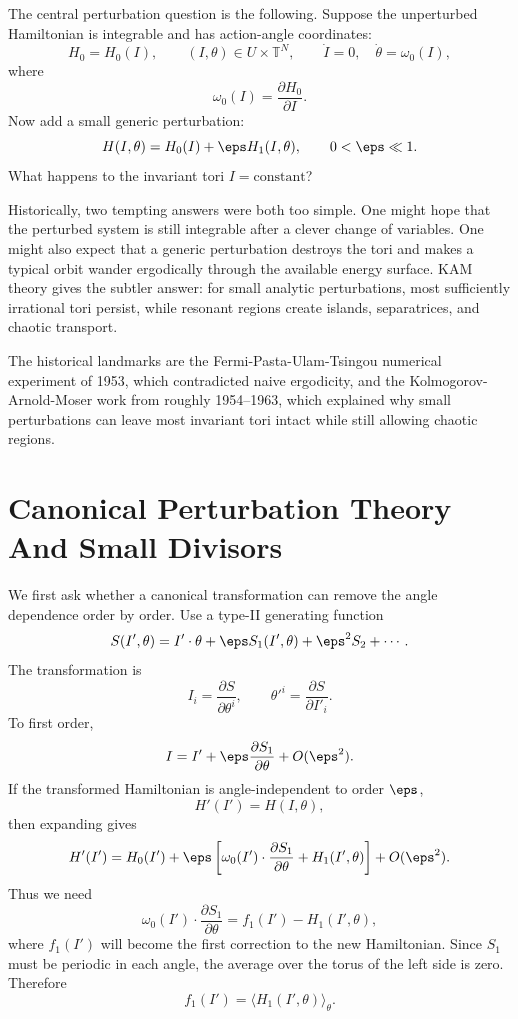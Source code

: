 The central perturbation question is the following. Suppose the unperturbed
Hamiltonian is integrable and has action-angle coordinates:
\[
  H_0=H_0(I),
  \qquad
  (I,\theta)\in U\times\mathbb T^N,
  \qquad
  \dot I=0,\quad \dot\theta=\omega_0(I),
\]
where
\[
  \omega_0(I)=\frac{\partial H_0}{\partial I}.
\]
Now add a small generic perturbation:
\[
  H(I,\theta)=H_0(I)+\eps H_1(I,\theta),
  \qquad
  0<\eps\ll 1.
\]
What happens to the invariant tori \(I=\text{constant}\)?

Historically, two tempting answers were both too simple. One might hope that
the perturbed system is still integrable after a clever change of variables.
One might also expect that a generic perturbation destroys the tori and makes a
typical orbit wander ergodically through the available energy surface. KAM
theory gives the subtler answer: for small analytic perturbations, most
sufficiently irrational tori persist, while resonant regions create islands,
separatrices, and chaotic transport.

The historical landmarks are the Fermi-Pasta-Ulam-Tsingou numerical experiment
of 1953, which contradicted naive ergodicity, and the
Kolmogorov-Arnold-Moser work from roughly 1954--1963, which explained why
small perturbations can leave most invariant tori intact while still allowing
chaotic regions.

\section{Canonical Perturbation Theory And Small Divisors}
\label{sec:canonical-perturbation-small-divisors}

We first ask whether a canonical transformation can remove the angle dependence
order by order. Use a type-II generating function
\[
  S(I',\theta)=I'\cdot\theta+\eps S_1(I',\theta)+\eps^2S_2+\cdots.
\]
The transformation is
\[
  I_i=\frac{\partial S}{\partial \theta^i},
  \qquad
  \theta'^i=\frac{\partial S}{\partial I'_i}.
\]
To first order,
\[
  I=I'+\eps\frac{\partial S_1}{\partial \theta}+O(\eps^2).
\]
If the transformed Hamiltonian is angle-independent to order \(\eps\),
\[
  H'(I')=H(I,\theta),
\]
then expanding gives
\[
  H'(I')
  =
  H_0(I')
  +
  \eps\left[
    \omega_0(I')\cdot\frac{\partial S_1}{\partial \theta}
    +
    H_1(I',\theta)
  \right]
  +
  O(\eps^2).
\]
Thus we need
\[
  \omega_0(I')\cdot\frac{\partial S_1}{\partial \theta}
  =
  f_1(I')-H_1(I',\theta),
\]
where \(f_1(I')\) will become the first correction to the new Hamiltonian.
Since \(S_1\) must be periodic in each angle, the average over the torus of the
left side is zero. Therefore
\[
  f_1(I')=\langle H_1(I',\theta)\rangle_\theta.
\]

